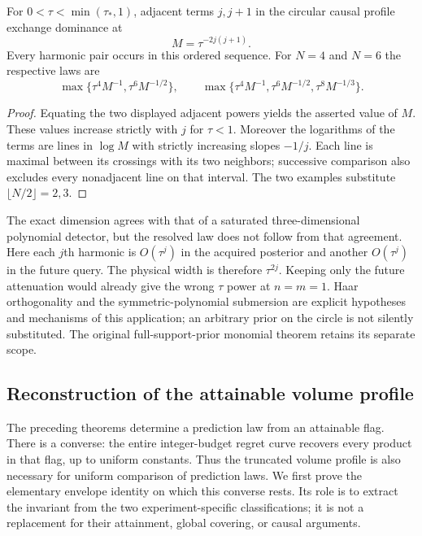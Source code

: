 \begin{corollary}\label{cor:circle-phases}
For $0<\tau<\min(\tau_*,1)$, adjacent terms $j,j+1$ in the circular
causal profile exchange dominance at
\[
 M=\tau^{-2j(j+1)}.
\]
Every harmonic pair occurs in this ordered sequence. For $N=4$ and $N=6$
the respective laws are
\[
 \max\{\tau^4M^{-1},\tau^6M^{-1/2}\},\qquad
 \max\{\tau^4M^{-1},\tau^6M^{-1/2},\tau^8M^{-1/3}\}.
\]
\end{corollary}
\begin{proof}
Equating the two displayed adjacent powers yields the asserted value of
$M$. These values increase strictly with $j$ for $\tau<1$. Moreover
the logarithms of the terms are lines in $\log M$ with strictly
increasing slopes $-1/j$. Each line is maximal between its crossings
with its two neighbors; successive comparison also excludes every
nonadjacent line on that interval. The two examples substitute
$\lfloor N/2\rfloor=2,3$.
\end{proof}

The exact dimension agrees with that of a saturated three-dimensional
polynomial detector, but the resolved law does not follow from that
agreement. Here each $j$th harmonic is $O(\tau^j)$ in the acquired
posterior and another $O(\tau^j)$ in the future query. The physical
width is therefore $\tau^{2j}$. Keeping only the future attenuation
would already give the wrong $\tau$ power at $n=m=1$. Haar orthogonality
and the symmetric-polynomial submersion are explicit hypotheses and
mechanisms of this application; an arbitrary prior on the circle is not
silently substituted. The original full-support-prior monomial theorem
retains its separate scope.


\subsection{Reconstruction of the attainable volume profile}
\label{sec:operational-reconstruction}
The preceding theorems determine a prediction law from an attainable
flag. There is a converse: the entire integer-budget regret curve
recovers every product in that flag, up to uniform constants. Thus the
truncated volume profile is also necessary for uniform comparison of
prediction laws. We first prove the elementary envelope identity on
which this converse rests. Its role is to extract the invariant from
the two experiment-specific classifications; it is not a replacement
for their attainment, global covering, or causal arguments.

